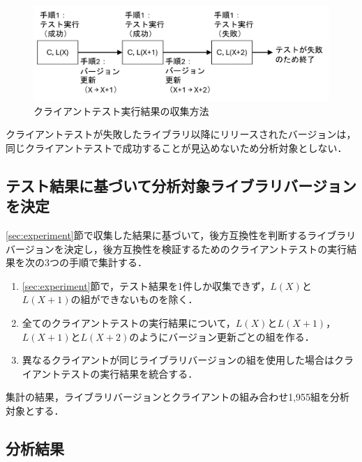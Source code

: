 \documentclass[submit]{ipsj}
\begin{document}
\begin{figure}[t]
  \centering
  \includegraphics[width=1\linewidth]{IPSJjournal_maekawa_fig/experiment-example1.pdf}
  \caption{クライアントテスト実行結果の収集方法}
  \label{fig:experimentExample}
  \vspace{-4mm}
\end{figure}

クライアントテストが失敗したライブラリ以降にリリースされたバージョンは，同じクライアントテストで成功することが見込めないため分析対象としない．


\subsection{テスト結果に基づいて分析対象ライブラリバージョンを決定}

\ref{sec:experiment}節で収集した結果に基づいて，後方互換性を判断するライブラリバージョンを決定し，後方互換性を検証するためのクライアントテストの実行結果を次の3つの手順で集計する．
\begin{enumerate}
  \item \ref{sec:experiment}節で，テスト結果を1件しか収集できず，$L(X)$と$L(X+1)$の組ができないものを除く．
  \item 全てのクライアントテストの実行結果について，$L(X)$と$L(X+1)$，$L(X+1)$と$L(X+2)$のようにバージョン更新ごとの組を作る．
  \item 異なるクライアントが同じライブラリバージョンの組を使用した場合はクライアントテストの実行結果を統合する．
\end{enumerate}
集計の結果，ライブラリバージョンとクライアントの組み合わせ1,955組を分析対象とする．

\subsection{分析結果}

\end{document}
